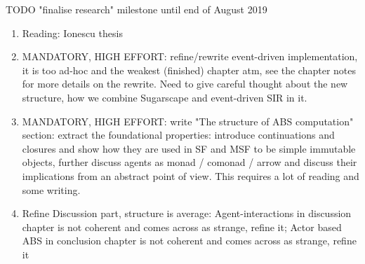 \documentclass[oneside]{book}
\begin{document}
TODO "finalise research" milestone until end of August 2019
\begin{enumerate}
	\item Reading: Ionescu thesis

	\item MANDATORY, HIGH EFFORT: refine/rewrite event-driven implementation, it is too ad-hoc and the weakest (finished) chapter atm, see the chapter notes for more details on the rewrite. Need to give careful thought about the new structure, how we combine Sugarscape and event-driven SIR in it.
	
	\item MANDATORY, HIGH EFFORT: write "The structure of ABS computation" section: extract the foundational properties: introduce continuations and closures and show how they are used in SF and MSF to be simple immutable objects, further discuss agents as monad / comonad / arrow and discuss their implications from an abstract point of view. This requires a lot of reading and some writing.

	\item Refine Discussion part, structure is average: Agent-interactions in discussion chapter is not coherent and comes across as strange, refine it; Actor based ABS in conclusion chapter is not coherent and comes across as strange, refine it

\end{enumerate}
\end{document}
